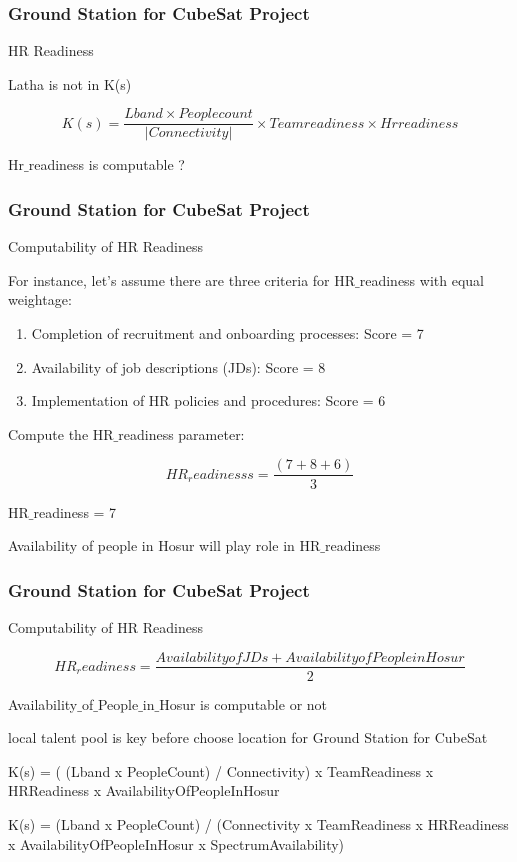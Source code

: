 \newpage
\begin{frame}
\frametitle{Ground Station for CubeSat Project }
\begin{block}{HR Readiness}

Latha is not in K(s)

\[ 
K(s) = \frac{Lband \times Peoplecount}{|Connectivity|}   \times Teamreadiness \times  Hrreadiness
\] 

 Hr$\_$readiness is computable ?

\end{block}
\end{frame}



\newpage
\begin{frame}
\frametitle{Ground Station for CubeSat Project }
\begin{block}{Computability of HR Readiness}

For instance, let's assume there are three criteria for HR$\_$readiness with equal weightage:

\begin{enumerate}
    \item  Completion of recruitment and onboarding processes: Score = 7
\item  Availability of job descriptions (JDs): Score = 8
\item  Implementation of HR policies and procedures: Score = 6
\end{enumerate}



Compute the HR$\_$readiness parameter:

\[ HR_readinesss =\frac{(7 + 8 + 6)}{3}  \] 

 HR$\_$readiness =  7


Availability of people in Hosur will play role in  HR$\_$readiness

\end{block}
\end{frame}


\newpage
\begin{frame}
\frametitle{Ground Station for CubeSat Project }
\begin{block}{Computability of HR Readiness}

\[  
HR_readiness = \frac{AvailabilityofJDs + AvailabilityofPeopleinHosur}{2}
\]

Availability$\_$of$\_$People$\_$in$\_$Hosur is computable or not


 local talent pool is key before choose location for Ground Station for CubeSat

 K(s) = ( (Lband x PeopleCount) / Connectivity) x TeamReadiness x HRReadiness x AvailabilityOfPeopleInHosur

 K(s) = (Lband x PeopleCount) / (Connectivity x TeamReadiness x HRReadiness x AvailabilityOfPeopleInHosur x SpectrumAvailability)
 
\end{block}
\end{frame}


